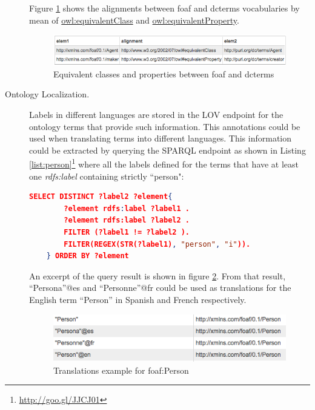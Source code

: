 \documentclass{iosart2c}
\begin{document}
\begin{description}
\begin{lstlisting}[float=htb,caption={SPARQL query asking for all the equivalent classes and properties between the vocabularies foaf and dcterms. },label=list:alignment, language=json]
	\end{lstlisting}
	
	Figure \ref{fig:eqCR} shows the alignments between foaf and dcterms vocabularies by mean of \url{owl:equivalentClass} and \url{owl:equivalentProperty}.
    \begin{figure}
      \centering
      \includegraphics[width=1.0\linewidth]{equivalentCandR.png}
      \caption{Equivalent classes and properties between foaf and dcterms}
      \label{fig:eqCR}
    \end{figure}
    
 \item [Ontology Localization.] Labels in different languages are stored in the LOV endpoint for the ontology terms that provide such information. This annotations could be used when translating terms into different languages. This information could be extracted by querying the SPARQL endpoint as shown in Listing \ref{list:person}\footnote{\url{http://goo.gl/JJCJ01}} where all the labels defined for the terms that have at least one \emph{rdfs:label} containing strictly ``person":
		
    \begin{lstlisting}[float=htb,caption={SPARQL query asking all the labels defined for the terms containing person.},label=list:person, language=json]
    SELECT DISTINCT ?label2 ?element{
		?element rdfs:label ?label1 .
		?element rdfs:label ?label2 .
		FILTER (?label1 != ?label2 ).
		FILTER(REGEX(STR(?label1), "person", "i")).
	} ORDER BY ?element
	\end{lstlisting}
							
   An excerpt of the query result is shown in figure \ref{fig:translations}. From that result, ``Persona''@es and ``Personne''@fr could be used as translations for the English term ``Person'' in Spanish and French respectively.
   \begin{figure}
     \centering
     \includegraphics[width=.90\linewidth]{translations1.png}
     \caption{Translations example for foaf:Person}
     \label{fig:translations}
   \end{figure}
   
\end{description}
\end{document}
